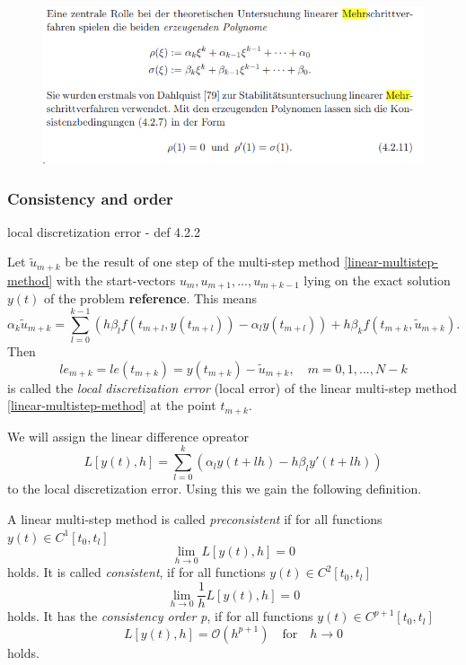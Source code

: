 \begin{figure}[H]
	\centering
	\includegraphics[width=0.7\linewidth]{screenshot013}
	\caption{}
	\label{fig:screenshot013}
\end{figure}


\subsubsection{Consistency and order}
local discretization error - def 4.2.2
\begin{definition}
	Let $\tilde{u}_{m+k}$ be the result of one step of the multi-step method \ref{linear-multistep-method} with the start-vectors $u_m, u_{m+1}, ..., u_{m+k-1}$ lying on the exact solution $y(t)$ of the problem \textbf{reference}. This means
	\begin{displaymath}
		\alpha_k \tilde{u}_{m+k} = \sum_{l=0}^{k-1} \left( h \beta_l f(t_{m+l}, y(t_{m+l})) - \alpha_l y(t_{m+l}) \right) + h \beta_k f(t_{m+k}, \tilde{u}_{m+k}) .
	\end{displaymath}
	Then
	\begin{displaymath}
		le_{m+k} = le(t_{m+k}) = y(t_{m+k}) - \tilde{u}_{m+k}, \quad m=0,1,...,N-k
	\end{displaymath}
	is called the \emph{local discretization error} (local error) of the linear multi-step method \ref{linear-multistep-method} at the point $t_{m+k}$.
\end{definition}

We will assign the linear difference opreator
\begin{equation}
	L[y(t),h] = \sum_{l=0}^{k} \left( \alpha_l y(t+lh) - h \beta_l y'(t+lh) \right)
\end{equation}
to the local discretization error. Using this we gain the following definition.

\begin{definition}
	A linear multi-step method is called \emph{preconsistent} if for all functions $y(t) \in C^1[t_0,t_l]$
	\begin{displaymath}
		\lim\limits_{h \to 0} L[y(t),h]=0
	\end{displaymath}
	holds. It is called \emph{consistent}, if for all functions $y(t) \in C^2[t_0,t_l]$
	\begin{displaymath}
		\lim\limits_{h \to 0} \frac{1}{h} L[y(t),h] = 0
	\end{displaymath}
	holds. It has the \emph{consistency order p}, if for all functions $y(t) \in C^{p+1}[t_0, t_l]$
	\begin{displaymath}
		L[y(t),h] = \mathcal{O}(h^{p+1}) \quad \text{for} \quad h \to 0
	\end{displaymath}
	holds.
\end{definition}

